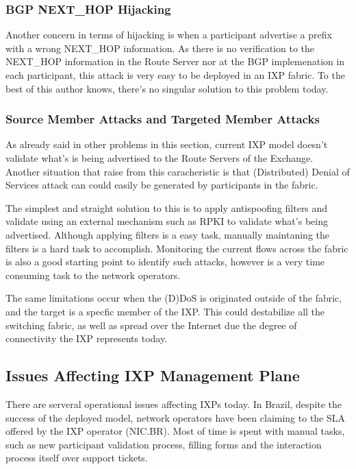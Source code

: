 \documentclass[conference]{IEEEtran/IEEEtran}
\begin{document}
\subsubsection{BGP NEXT\_HOP Hijacking}
Another concern in terms of hijacking is when a participant advertise a prefix with a wrong NEXT\_HOP information. As there is no verification to the NEXT\_HOP information in the Route Server nor at the BGP implemenation in each participant, this attack is very easy to be deployed in an IXP fabric. To the best of this author knows, there's no singular solution to this problem today.

\subsubsection{Source Member Attacks and Targeted Member Attacks}
As already said in other problems in this section, current IXP model doesn't validate what's is being advertised to the Route Servers of the Exchange. Another situation that raise from this caracheristic is that (Distributed) Denial of Services attack can could easily be generated by participants in the fabric. 

The simplest and straight solution to this is to apply antispoofing filters and validate using an external mechanism such as RPKI to validate what's being advertised. Although applying filters is a easy task, manually maintaning the filters is a hard task to accomplish. Monitoring the current flows across the fabric is also a good starting point to identify such attacks, however is a very time consuming task to the network operators.

The same limitations occur when the (D)DoS is originated outside of the fabric, and the target is a specfic member of the IXP. This could destabilize all the switching fabric, as well as spread over the Internet due the degree of connectivity the IXP represents today.

\subsection{Issues Affecting IXP Management Plane}
There are serveral operational issues affecting IXPs today. In Brazil, despite the success of the deployed model, network operators have been claiming to the SLA offered by the IXP operator (NIC.BR). Most of time is spent with manual tasks, such as new participant validation process, filling forms and the interaction process itself over support tickets.
\end{document}
